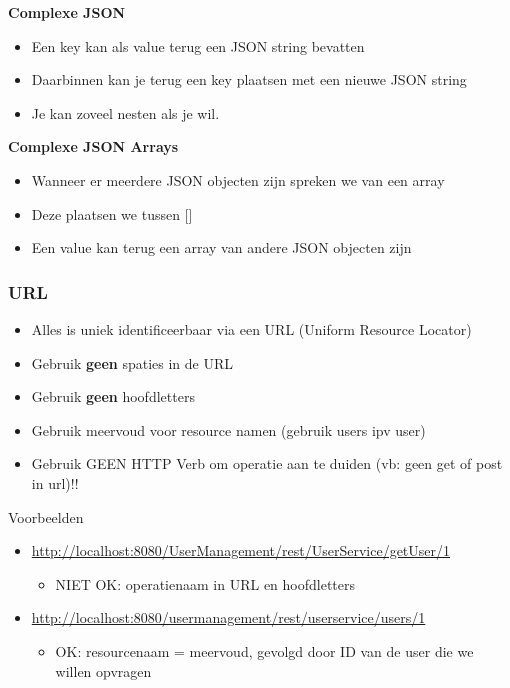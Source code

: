 \documentclass{article}
\newcommand{\bold}[1]{\textbf{#1}}
\begin{document}
\bold{Complexe JSON}

\begin{itemize}
    \item Een key kan als value terug een JSON string bevatten
    \item Daarbinnen kan je terug een key plaatsen met een nieuwe JSON string
    \item Je kan zoveel nesten als je wil.
\end{itemize}

\bold{Complexe JSON Arrays}

\begin{itemize}
    \item Wanneer er meerdere JSON objecten zijn spreken we van een array
    \item Deze plaatsen we tussen []
    \item Een value kan terug een array van andere JSON objecten zijn
\end{itemize}

\subsubsection{URL}
\begin{itemize}
    \item Alles is uniek identificeerbaar via een URL (Uniform Resource Locator)
    \item Gebruik \bold{geen} spaties in de URL
    \item Gebruik \bold{geen} hoofdletters
    \item Gebruik meervoud voor resource namen (gebruik users ipv user)
    \item Gebruik GEEN HTTP Verb om operatie aan te duiden (vb: geen get of post in url)!!
\end{itemize}

Voorbeelden 

\begin{itemize}
    \item \url{http://localhost:8080/UserManagement/rest/UserService/getUser/1} 
    \begin{itemize}
        \item NIET OK: operatienaam in URL en hoofdletters
    \end{itemize}
    \item \url{http://localhost:8080/usermanagement/rest/userservice/users/1} 
    \begin{itemize}
        \item OK: resourcenaam = meervoud, gevolgd door ID van de user die we willen opvragen
    \end{itemize}
\end{itemize}
\end{document}
